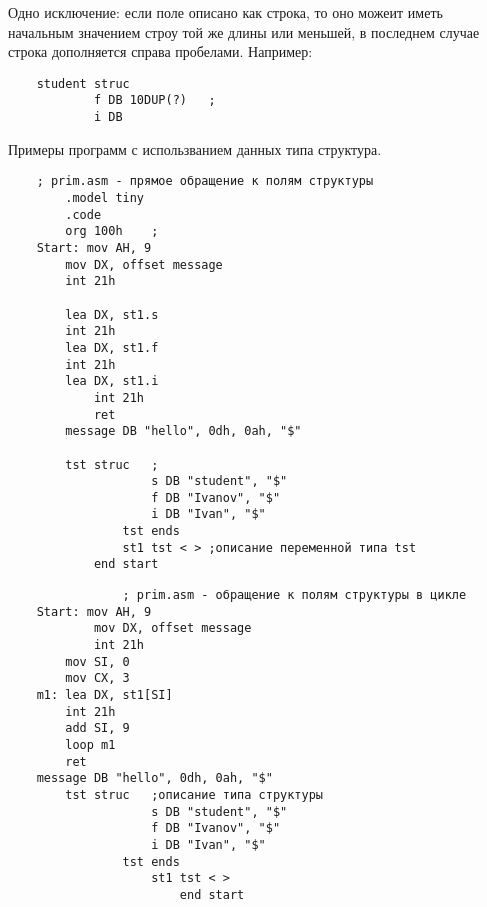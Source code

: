 Одно исключение: если поле описано как строка, то оно можеит иметь начальным значением строу той же длины или меньшей, в последнем случае строка дополняется справа пробелами.
Например:
\begin{verbatim}
    student struc
            f DB 10DUP(?)   ;
            i DB
\end{verbatim}
Примеры программ с использванием данных типа структура.
\begin{verbatim}
    ; prim.asm - прямое обращение к полям структуры
        .model tiny
        .code
        org 100h    ;
    Start: mov AH, 9
        mov DX, offset message
        int 21h

        lea DX, st1.s 
        int 21h
        lea DX, st1.f
        int 21h
        lea DX, st1.i 
            int 21h
            ret
        message DB "hello", 0dh, 0ah, "$"

        tst struc   ;
                    s DB "student", "$"
                    f DB "Ivanov", "$"
                    i DB "Ivan", "$"
                tst ends
                st1 tst < > ;описание переменной типа tst
            end start

\end{verbatim}

\begin{verbatim}
                ; prim.asm - обращение к полям структуры в цикле
    Start: mov AH, 9
            mov DX, offset message
            int 21h
        mov SI, 0
        mov CX, 3
    m1: lea DX, st1[SI]
        int 21h
        add SI, 9
        loop m1
        ret
    message DB "hello", 0dh, 0ah, "$"
        tst struc   ;описание типа структуры
                    s DB "student", "$"
                    f DB "Ivanov", "$"
                    i DB "Ivan", "$"
                tst ends
                    st1 tst < > 
                        end start


\end{verbatim}